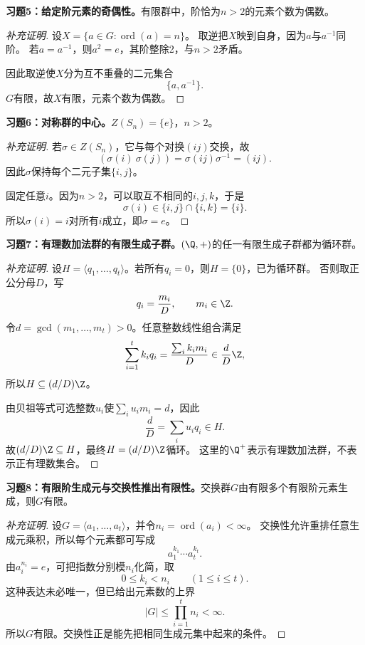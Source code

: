 \begin{problem}
\textbf{习题5：给定阶元素的奇偶性。}有限群中，阶恰为$n>2$的元素个数为偶数。
\end{problem}
\begin{proof}[补充证明]
设$X=\{a\in G:\operatorname{ord}(a)=n\}$。
取逆把$X$映到自身，因为$a$与$a^{-1}$同阶。
若$a=a^{-1}$，则$a^2=e$，其阶整除2，与$n>2$矛盾。

因此取逆使$X$分为互不重叠的二元集合
\[
\{a,a^{-1}\}.
\]
$G$有限，故$X$有限，元素个数为偶数。
\end{proof}

\begin{problem}
\textbf{习题6：对称群的中心。}$Z(S_n)=\{e\}$，$n>2$。
\end{problem}
\begin{proof}[补充证明]
若$\sigma\in Z(S_n)$，它与每个对换$(ij)$交换，故
\[
(\sigma(i)\ \sigma(j))=\sigma(ij)\sigma^{-1}=(ij).
\]
因此$\sigma$保持每个二元子集$\{i,j\}$。

固定任意$i$。因为$n>2$，可以取互不相同的$i,j,k$，于是
\[
\sigma(i)\in\{i,j\}\cap\{i,k\}=\{i\}.
\]
所以$\sigma(i)=i$对所有$i$成立，即$\sigma=e$。
\end{proof}

\begin{problem}
\textbf{习题7：有理数加法群的有限生成子群。}$(\Q,+)$的任一有限生成子群都为循环群。
\end{problem}
\begin{proof}[补充证明]
设$H=\langle q_1,\ldots,q_t\rangle$。若所有$q_i=0$，则$H=\{0\}$，已为循环群。
否则取正公分母$D$，写
\[
q_i=\frac{m_i}{D},\qquad m_i\in\Z.
\]
令$d=\gcd(m_1,\ldots,m_t)>0$。任意整数线性组合满足
\[
\sum_{i=1}^t k_iq_i=\frac{\sum_i k_im_i}{D}\in\frac dD\Z,
\]
所以$H\subseteq(d/D)\Z$。

由贝祖等式可选整数$u_i$使$\sum_i u_im_i=d$，因此
\[
\frac dD=\sum_i u_iq_i\in H.
\]
故$(d/D)\Z\subseteq H$，最终$H=(d/D)\Z$循环。
这里的$\Q^+$表示有理数加法群，不表示正有理数集合。
\end{proof}

\begin{problem}
\textbf{习题8：有限阶生成元与交换性推出有限性。}交换群$G$由有限多个有限阶元素生成，则$G$有限。
\end{problem}
\begin{proof}[补充证明]
设$G=\langle a_1,\ldots,a_t\rangle$，并令$n_i=\operatorname{ord}(a_i)<\infty$。
交换性允许重排任意生成元乘积，所以每个元素都可写成
\[
a_1^{k_1}\cdots a_t^{k_t}.
\]
由$a_i^{n_i}=e$，可把指数分别模$n_i$化简，取
\[
0\leq k_i<n_i\qquad(1\leq i\leq t).
\]
这种表达未必唯一，但已给出元素数的上界
\[
|G|\leq\prod_{i=1}^t n_i<\infty.
\]
所以$G$有限。交换性正是能先把相同生成元集中起来的条件。
\end{proof}

